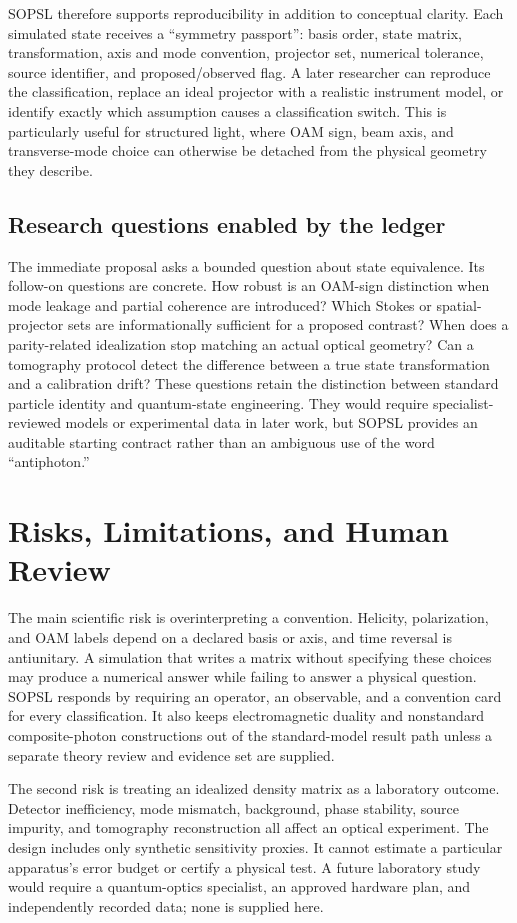 \documentclass[conference]{../../../../Conference-LaTeX-template_10-17-19/IEEEtran}
\begin{document}
SOPSL therefore supports reproducibility in addition to conceptual clarity. Each simulated state receives a ``symmetry passport'': basis order, state matrix, transformation, axis and mode convention, projector set, numerical tolerance, source identifier, and proposed/observed flag. A later researcher can reproduce the classification, replace an ideal projector with a realistic instrument model, or identify exactly which assumption causes a classification switch. This is particularly useful for structured light, where OAM sign, beam axis, and transverse-mode choice can otherwise be detached from the physical geometry they describe.

\subsection{Research questions enabled by the ledger}
The immediate proposal asks a bounded question about state equivalence. Its follow-on questions are concrete. How robust is an OAM-sign distinction when mode leakage and partial coherence are introduced? Which Stokes or spatial-projector sets are informationally sufficient for a proposed contrast? When does a parity-related idealization stop matching an actual optical geometry? Can a tomography protocol detect the difference between a true state transformation and a calibration drift? These questions retain the distinction between standard particle identity and quantum-state engineering. They would require specialist-reviewed models or experimental data in later work, but SOPSL provides an auditable starting contract rather than an ambiguous use of the word ``antiphoton.''

\section{Risks, Limitations, and Human Review}
The main scientific risk is overinterpreting a convention. Helicity, polarization, and OAM labels depend on a declared basis or axis, and time reversal is antiunitary. A simulation that writes a matrix without specifying these choices may produce a numerical answer while failing to answer a physical question. SOPSL responds by requiring an operator, an observable, and a convention card for every classification. It also keeps electromagnetic duality and nonstandard composite-photon constructions out of the standard-model result path unless a separate theory review and evidence set are supplied.

The second risk is treating an idealized density matrix as a laboratory outcome. Detector inefficiency, mode mismatch, background, phase stability, source impurity, and tomography reconstruction all affect an optical experiment. The design includes only synthetic sensitivity proxies. It cannot estimate a particular apparatus’s error budget or certify a physical test. A future laboratory study would require a quantum-optics specialist, an approved hardware plan, and independently recorded data; none is supplied here.
\end{document}
